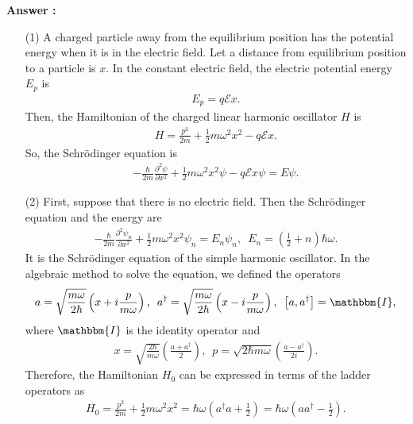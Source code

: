 \documentclass[floatfix,nofootinbib,superscriptaddress,fleqn]{revtex4-2}
\begin{document}
\noindent \textbf{Answer : }
\begin{itemize}
  \item[(1)] A charged particle away from the equilibrium position 
  has the potential energy when it is in the electric field. 
  Let a distance from equilibrium position to a particle is $x$.
  In the constant electric field, 
  the electric potential energy $E_p$ is
  \begin{align}
    E_p = q\mathcal{E}x.
  \end{align} 
  Then, the Hamiltonian of the charged linear
  harmonic oscillator $H$ is
  \begin{align}\label{eq:1-1}
    H = \frac{p^2}{2m}+\frac{1}{2}m\omega^2x^2-q\mathcal{E}x.
  \end{align}
  So, the Schr\"odinger equation is
  \begin{align}\label{eq:1-2}
    -\frac{\hbar}{2m}\frac{\partial^2\psi}{\partial x^2}
    +\frac{1}{2}m\omega^2x^2\psi
    -q\mathcal{E}x\psi = E\psi.
  \end{align}
  \item[(2)] First, suppose that there is no electric field.
  Then the Schr\"odinger equation and 
  the energy are
  \begin{align}
    -\frac{\hbar}{2m}\frac{\partial^2\psi_n}{\partial x^2}
    +\frac{1}{2}m\omega^2x^2\psi_n = E_n\psi_n,\,\,\, 
    E_n = \left(\frac{1}{2}+n\right)\hbar\omega.
  \end{align}
  It is the Schr\"odinger equation of the simple harmonic oscillator. 
  In the algebraic method to solve the equation, 
  we defined the operators
  \begin{align}
      a = \sqrt{\frac{m\omega}{2\hbar}}
      \left(x+i\frac{p}{m\omega}\right),\,\,\,
      a^\dagger = \sqrt{\frac{m\omega}{2\hbar}}
      \left(x-i\frac{p}{m\omega}\right),\,\,\,
      \left[a,a^\dagger\right] = \mathbbm{I},
  \end{align}
  where $\mathbbm{I}$ is the identity operator and
  \begin{align}\label{eq:1-2-1}
    x = \sqrt{\frac{2\hbar}{m\omega}}
    \left(\frac{a+a^\dagger}{2}\right),\,\,\,
    p = \sqrt{2\hbar m\omega}
    \left(\frac{a-a^\dagger}{2i}\right).
  \end{align}
 Therefore, the Hamiltonian $H_0$ can be expressed in terms of
 the ladder operators as
  \begin{align}\label{eq:1-3}
    H_0 = \frac{p^2}{2m}+\frac{1}{2}m\omega^2x^2 
    = \hbar\omega\left(a^\dagger a + \frac{1}{2}\right)
    = \hbar\omega\left(a a^\dagger - \frac{1}{2}\right).

\end{align}
\end{itemize}
\end{document}
